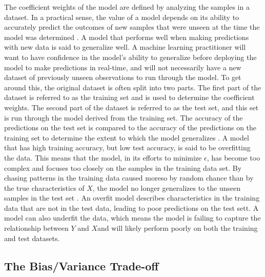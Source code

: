 \documentclass[sigconf]{acmart}
\begin{document}
The coefficient weights of the model are defined by analyzing the samples in a dataset. In a practical sense, the value of a model depends on its ability to accurately predict the outcomes of new samples that were unseen at the time the model was determined \cite{cite08}. A model that performs well when making predictions with new data is said to generalize well.
A machine learning practitioner will want to have confidence in the model's ability to generalize before deploying the model to make predictions in real-time, and will not necessarily have a new dataset of previously unseen observations to run through the model. To get around this, the original dataset is often split into two parts. The first part of the dataset is referred to as the training set and is used to determine the coefficient weights. The second part of the dataset is referred to as the test set, and this set is run through the model derived from the training set. The accuracy of the predictions on the test set is compared to the accuracy of the predictions on the training set to determine the extent to which the model generalizes \cite{cite08}.
A model that has high training accuracy, but low test accuracy, is said to be overfitting the data. This means that the model, in its efforts to minimize \(\epsilon\), has become too complex and focuses too closely on the samples in the training data set. By chasing patterns in the training data caused moreso by random chance than by the true characteristics of \(X\), the model no longer generalizes to the unseen samples in the test set \cite{cite03}\cite{cite08}. An overfit model describes characteristics in the training data that are not in the test data, leading to poor predictions on the test sett.
A model can also underfit the data, which means the model is failing to capture the relationship between \(Y\) and \(X\)and will likely perform poorly on both the training and test datasets.

\subsection{The Bias/Variance Trade-off}
\end{document}
